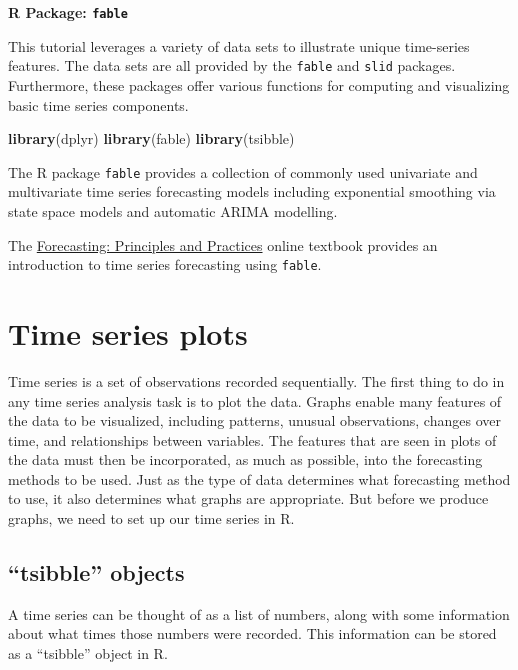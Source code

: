 \documentclass[]{book}
\newenvironment{Shaded}{\begin{snugshade}}{\end{snugshade}}
\newcommand{\KeywordTok}[1]{\textcolor[rgb]{0.13,0.29,0.53}{\textbf{#1}}}
\newcommand{\NormalTok}[1]{#1}
\begin{document}
\textbf{R Package: \texttt{fable}}

This tutorial leverages a variety of data sets to illustrate unique
time-series features. The data sets are all provided by the
\texttt{fable} and \texttt{slid} packages. Furthermore, these packages
offer various functions for computing and visualizing basic time series
components.

\begin{Shaded}
\begin{Highlighting}[]
\KeywordTok{library}\NormalTok{(dplyr)}
\KeywordTok{library}\NormalTok{(fable)}
\KeywordTok{library}\NormalTok{(tsibble)}
\end{Highlighting}
\end{Shaded}

The R package \texttt{fable} provides a collection of commonly used
univariate and multivariate time series forecasting models including
exponential smoothing via state space models and automatic ARIMA
modelling.

The \href{https://otexts.com/fpp3/tsibbles.html}{Forecasting: Principles
and Practices} online textbook provides an introduction to time series
forecasting using \texttt{fable}.

\section{Time series plots}\label{time-series-plots}

Time series is a set of observations recorded sequentially. The first
thing to do in any time series analysis task is to plot the data. Graphs
enable many features of the data to be visualized, including patterns,
unusual observations, changes over time, and relationships between
variables. The features that are seen in plots of the data must then be
incorporated, as much as possible, into the forecasting methods to be
used. Just as the type of data determines what forecasting method to
use, it also determines what graphs are appropriate. But before we
produce graphs, we need to set up our time series in R.

\subsection{\texorpdfstring{``tsibble''
objects}{tsibble objects}}\label{tsibble-objects}

A time series can be thought of as a list of numbers, along with some
information about what times those numbers were recorded. This
information can be stored as a ``tsibble'' object in R.
\end{document}

